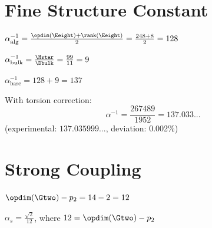 \section{Fine Structure Constant}

\begin{definition}\label{def:alpha_inv_algebraic}
    \leanok
    $\alpha^{-1}_{\mathrm{alg}} = \frac{\opdim(\Eeight) + \rank(\Eeight)}{2} = \frac{248 + 8}{2} = 128$
\end{definition}

\begin{definition}\label{def:alpha_inv_bulk}
    \leanok
    $\alpha^{-1}_{\mathrm{bulk}} = \frac{\Hstar}{\Dbulk} = \frac{99}{11} = 9$
\end{definition}

\begin{theorem}\label{thm:alpha_inv_base}
    \leanok
    $\alpha^{-1}_{\mathrm{base}} = 128 + 9 = 137$
\end{theorem}

\begin{theorem}\label{thm:alpha_inv_complete}
    \leanok
    With torsion correction:
    \[
        \alpha^{-1} = \frac{267489}{1952} = 137.033...
    \]
    (experimental: $137.035999...$, deviation: 0.002\%)
\end{theorem}

\section{Strong Coupling}

\begin{definition}\label{def:alpha_s_denom}
    \leanok
    $\opdim(\Gtwo) - p_2 = 14 - 2 = 12$
\end{definition}

\begin{theorem}\label{thm:alpha_s_structure}
    \leanok
    $\alpha_s = \frac{\sqrt{2}}{12}$, where $12 = \opdim(\Gtwo) - p_2$
\end{theorem}

